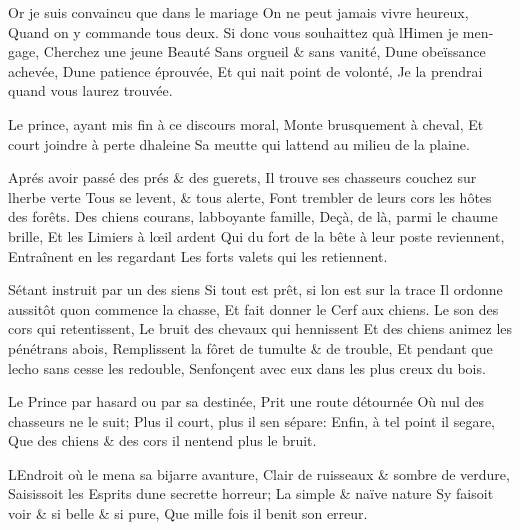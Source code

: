\documentclass[14pt,a4paper]{memoir}
\begin{document}
\begin{otherlanguage}{french}
{Or je suis convaincu que dans le mariage} {On ne peut jamais vivre
heureux,} {Quand on y commande tous deux.} {Si donc vous souhaittez
qu\textquotesingle à l\textquotesingle Himen je
m\textquotesingle engage, } {Cherchez une jeune Beauté} {Sans orgueil \&
sans vanité,} {D\textquotesingle une obeïssance achevée,}
{D\textquotesingle une patience éprouvée,} {Et qui n\textquotesingle ait
point de volonté,} {Je la prendrai quand vous l\textquotesingle aurez
trouvée.}

{Le prince, ayant mis fin à ce discours moral,} {Monte brusquement à
cheval,} {Et court joindre à perte d\textquotesingle haleine} {Sa meutte
qui l\textquotesingle attend au milieu de la plaine.}

{Aprés avoir passé des prés \& des guerets,} {Il trouve ses chasseurs
couchez sur l\textquotesingle herbe verte } {Tous se levent, \& tous
alerte,} {Font trembler de leurs cors les hôtes des forêts. } {Des
chiens courans, l\textquotesingle abboyante famille,} {Deçà, de là,
parmi le chaume brille,} {Et les Limiers à l\textquotesingle œil ardent}
{Qui du fort de la bête à leur poste reviennent, } {Entraînent en les
regardant} {Les forts valets qui les retiennent.}

{S\textquotesingle étant instruit par un des siens} {Si tout est prêt,
si l\textquotesingle on est sur la trace} {Il ordonne aussitôt
qu\textquotesingle on commence la chasse,} {Et fait donner le Cerf aux
chiens.} {Le son des cors qui retentissent,} {Le bruit des chevaux qui
hennissent} {Et des chiens animez les pénétrans abois,} {Remplissent la
fôret de tumulte \& de trouble, } {Et pendant que l\textquotesingle echo
sans cesse les redouble,} {S\textquotesingle enfonçent avec eux dans les
plus creux du bois. }

{Le Prince par hasard ou par sa destinée,} {Prit une route détournée}
{Où nul des chasseurs ne le suit;} {Plus il court, plus il
s\textquotesingle en sépare:} {Enfin, à tel point il
s\textquotesingle egare,} {Que des chiens \& des cors il
n\textquotesingle entend plus le bruit.}

{L\textquotesingle Endroit où le mena sa bijarre avanture,} {Clair de
ruisseaux \& sombre de verdure,} {Saisissoit les Esprits
d\textquotesingle une secrette horreur;} {La simple \& naïve nature}
{S\textquotesingle y faisoit voir \& si belle \& si pure,} {Que mille
fois il benit son erreur.}


\end{otherlanguage}
\end{document}
